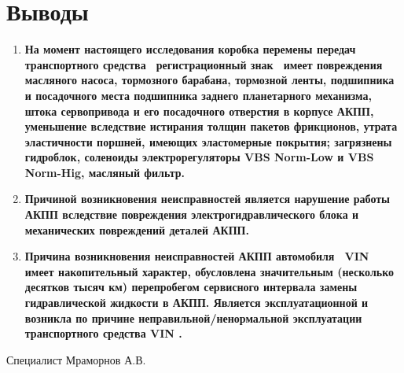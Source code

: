 \vspace{5mm}
\section{Выводы}

\begin{enumerate}
	\item \textbf{ На момент настоящего исследования  коробка перемены передач \, транспортного средства \, регистрационный знак \,
        имеет повреждения  масляного насоса, тормозного барабана, тормозной ленты, подшипника и посадочного места подшипника заднего планетарного механизма,  штока сервопривода и его посадочного отверстия в корпусе АКПП, уменьшение вследствие истирания толщин пакетов фрикционов, утрата эластичности поршней, имеющих эластомерные покрытия; загрязнены гидроблок, соленоиды электрорегуляторы VBS Norm-Low  и VBS Norm-Hig, масляный фильтр.  }
    \item \textbf{Причиной возникновения неисправностей является нарушение работы АКПП вследствие повреждения электрогидравлического блока и механических повреждений деталей АКПП.}
        \item \textbf{Причина возникновения неисправностей АКПП автомобиля \, VIN \,  имеет накопительный характер, обусловлена значительным (несколько десятков тысяч км) перепробегом сервисного интервала замены гидравлической жидкости в АКПП. Является  эксплуатационной и возникла по причине неправильной/ненормальной эксплуатации транспортного средства  VIN \vin.}
\end{enumerate}
\vspace{15mm}
\relax



{Специалист}\hfill           { Мраморнов А.В.}

\vspace{15mm}
